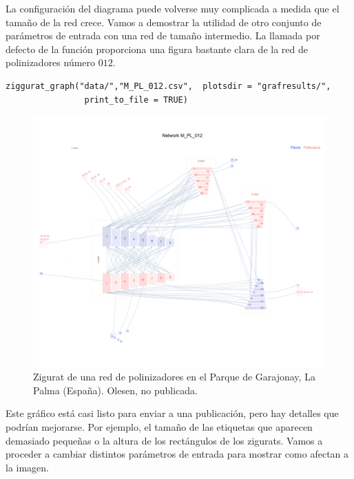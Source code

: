 \clearpage
La configuración del diagrama puede volverse muy complicada a medida que el tamaño de la red crece. Vamos a demostrar la
utilidad de otro conjunto de parámetros de entrada con una red de tamaño intermedio. La llamada por defecto de la función
proporciona una figura bastante clara de la red de polinizadores número $012$.

\fontsize{3.5mm}{3.5mm}\selectfont
\begin{verbatim}
ziggurat_graph("data/","M_PL_012.csv",  plotsdir = "grafresults/", 
                print_to_file = TRUE)
\end{verbatim}
\normalsize

\begin{figure}[hp!]
\centering
\includegraphics[scale=0.47]{ManFigs/M_PL_012_ziggurat.png}
\caption {Zigurat de una red de polinizadores en el Parque de Garajonay, La Palma (España). Olesen, no publicada.}
\label{fig:AKMAN_ziggurat_012}
\end{figure}

Este gráfico está casi listo para enviar a una publicación, pero hay detalles que podrían mejorarse. Por ejemplo, el tamaño
de las etiquetas que aparecen demasiado pequeñas o la altura de los rectángulos de los zigurats. Vamos a proceder a cambiar 
distintos parámetros de entrada para mostrar como afectan a la imagen.

